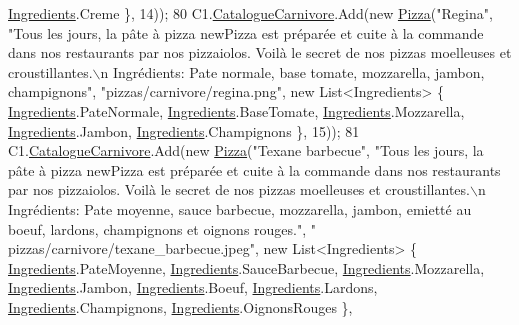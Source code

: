 \begin{DoxyCode}
      \hyperlink{namespaceModele_a001a8e89e56a724f24a249ba98080d41}{Ingredients}.Creme \}, 14));
80             C1.\hyperlink{classModele_1_1Catalogue_a4af9ef768f67cef6dfe545e22a6d63af}{CatalogueCarnivore}.Add(\textcolor{keyword}{new} \hyperlink{classModele_1_1Pizza}{Pizza}(\textcolor{stringliteral}{"Regina"}, \textcolor{stringliteral}{"Tous les jours, la pâte à
       pizza newPizza est préparée et cuite à la commande dans nos restaurants par nos pizzaiolos. Voilà le secret
       de nos pizzas moelleuses et croustillantes.\(\backslash\)n Ingrédients: Pate normale, base tomate, mozzarella, jambon,
       champignons"}, \textcolor{stringliteral}{"pizzas/carnivore/regina.png"}, \textcolor{keyword}{new} List<Ingredients> \{ \hyperlink{namespaceModele_a001a8e89e56a724f24a249ba98080d41}{Ingredients}.PateNormale, 
      \hyperlink{namespaceModele_a001a8e89e56a724f24a249ba98080d41}{Ingredients}.BaseTomate, \hyperlink{namespaceModele_a001a8e89e56a724f24a249ba98080d41}{Ingredients}.Mozzarella, 
      \hyperlink{namespaceModele_a001a8e89e56a724f24a249ba98080d41}{Ingredients}.Jambon, \hyperlink{namespaceModele_a001a8e89e56a724f24a249ba98080d41}{Ingredients}.Champignons \}, 15));
81             C1.\hyperlink{classModele_1_1Catalogue_a4af9ef768f67cef6dfe545e22a6d63af}{CatalogueCarnivore}.Add(\textcolor{keyword}{new} \hyperlink{classModele_1_1Pizza}{Pizza}(\textcolor{stringliteral}{"Texane barbecue"}, \textcolor{stringliteral}{"Tous les jours,
       la pâte à pizza newPizza est préparée et cuite à la commande dans nos restaurants par nos pizzaiolos. Voilà
       le secret de nos pizzas moelleuses et croustillantes.\(\backslash\)n Ingrédients: Pate moyenne, sauce barbecue,
       mozzarella, jambon, emietté au boeuf, lardons, champignons et oignons rouges."}, \textcolor{stringliteral}{"
      pizzas/carnivore/texane\_barbecue.jpeg"}, \textcolor{keyword}{new} List<Ingredients> \{ \hyperlink{namespaceModele_a001a8e89e56a724f24a249ba98080d41}{Ingredients}.PateMoyenne, \hyperlink{namespaceModele_a001a8e89e56a724f24a249ba98080d41}{Ingredients}.SauceBarbecue, 
      \hyperlink{namespaceModele_a001a8e89e56a724f24a249ba98080d41}{Ingredients}.Mozzarella, \hyperlink{namespaceModele_a001a8e89e56a724f24a249ba98080d41}{Ingredients}.Jambon, \hyperlink{namespaceModele_a001a8e89e56a724f24a249ba98080d41}{Ingredients}.Boeuf, 
      \hyperlink{namespaceModele_a001a8e89e56a724f24a249ba98080d41}{Ingredients}.Lardons, \hyperlink{namespaceModele_a001a8e89e56a724f24a249ba98080d41}{Ingredients}.Champignons, \hyperlink{namespaceModele_a001a8e89e56a724f24a249ba98080d41}{Ingredients}.OignonsRouges \},

\end{DoxyCode}
